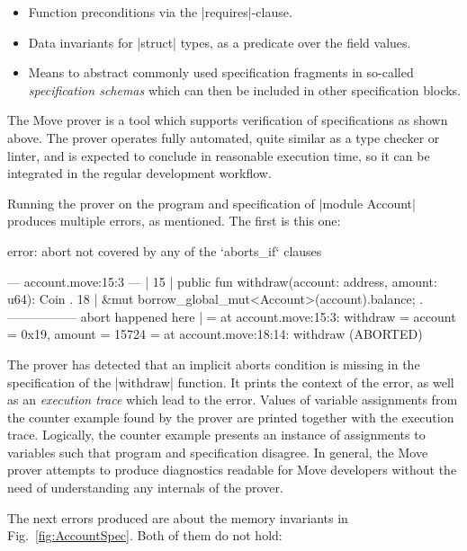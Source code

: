 \begin{itemize}
\item Function preconditions via the |requires|-clause.
\item Data invariants for |struct| types, as a predicate over the field values.
\item Means to abstract commonly used specification fragments in so-called
  \emph{specification schemas} which can then be included in other specification
  blocks.
\end{itemize}

\label{sec:RunningProver}

The Move prover is a tool which supports verification of specifications as shown
above. The prover operates fully automated, quite similar as a type checker or
linter, and is expected to conclude in reasonable execution time, so it can be
integrated in the regular development workflow.

Running the prover on the program and specification of |module Account| produces
multiple errors, as mentioned. The first is this one:


\begin{MoveDiag}
error: abort not covered by any of the `aborts_if` clauses

    --- account.move:15:3 ---
    |
 15 |  public fun withdraw(account: address, amount: u64): Coin
    .
 18 |         &mut borrow_global_mut<Account>(account).balance;
    .              ----------------- abort happened here
    |
    =     at account.move:15:3: withdraw
    =         account = 0x19, amount = 15724
    =     at account.move:18:14: withdraw (ABORTED)
\end{MoveDiag}

\noindent The prover has detected that an implicit aborts condition is missing
in the specification of the |withdraw| function. It prints the context of the
error, as well as an \emph{execution trace} which lead to the error. Values of
variable assignments from the counter example found by the prover are printed
together with the execution trace. Logically, the counter example presents an
instance of assignments to variables such that program and specification
disagree. In general, the Move prover attempts to produce diagnostics readable
for Move developers without the need of understanding any internals of the
prover.


The next errors produced are about the memory invariants in
Fig.~\ref{fig:AccountSpec}. Both of them do not hold:

